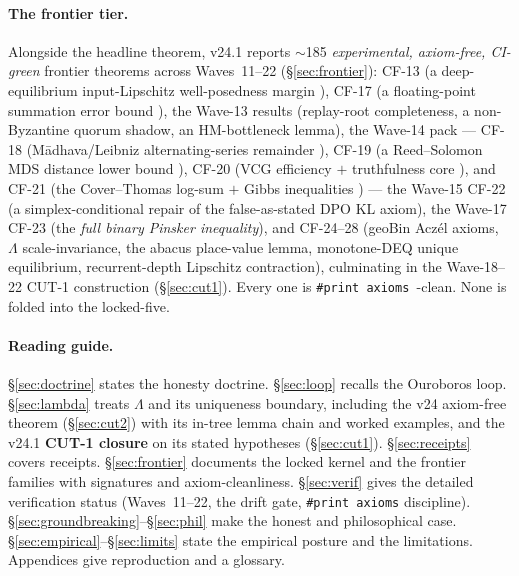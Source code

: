 \documentclass[11pt]{article}
\theoremstyle{plain}
\theoremstyle{definition}
\theoremstyle{remark}
\newcommand{\La}{\Lambda}
\newcommand{\leantext}[1]{\texttt{\def\_{\char`\_\penalty0\hskip0pt\relax}#1}}
\newcommand{\lean}[1]{\ifmmode\text{\leantext{#1}}\else\leantext{#1}\fi}
\newcommand{\printax}[1]{\lean{\#print~axioms~#1}}
\begin{document}
\paragraph{The frontier tier.}
Alongside the headline theorem, v24.1 reports $\sim$185 \emph{experimental,
axiom-free, CI-green} frontier theorems across Waves~11--22
(\S\ref{sec:frontier}): CF-13 (a deep-equilibrium input-Lipschitz well-posedness
margin \cite{baikolter2019}), CF-17 (a floating-point summation error bound
\cite{higham2002}), the Wave-13 results (replay-root completeness, a
non-Byzantine quorum shadow, an HM-bottleneck lemma), the Wave-14 pack ---
CF-18 (M\=adhava/Leibniz alternating-series remainder \cite{plofker2009}),
CF-19 (a Reed--Solomon MDS distance lower bound \cite{reedsolomon1960,singleton1964}),
CF-20 (VCG efficiency $+$ truthfulness core \cite{vickrey1961,clarke1971,groves1973,nisan2007}),
and CF-21 (the Cover--Thomas log-sum $+$ Gibbs inequalities \cite{coverthomas2006})
--- the Wave-15 CF-22 (a simplex-conditional repair of the false-as-stated DPO
KL axiom), the Wave-17 CF-23 (the \emph{full binary Pinsker inequality}), and
CF-24--28 (geoBin Acz\'el axioms, $\La$ scale-invariance, the abacus place-value
lemma, monotone-DEQ unique equilibrium, recurrent-depth Lipschitz contraction),
culminating in the Wave-18--22 CUT-1 construction (\S\ref{sec:cut1}).
Every one is \printax{}-clean. None is folded into the locked-five.

\paragraph{Reading guide.}
\S\ref{sec:doctrine} states the honesty doctrine. \S\ref{sec:loop} recalls the
Ouroboros loop. \S\ref{sec:lambda} treats $\La$ and its uniqueness boundary,
including the v24 axiom-free theorem (\S\ref{sec:cut2}) with its in-tree lemma
chain and worked examples, and the v24.1 \textbf{CUT-1 closure} on its stated
hypotheses (\S\ref{sec:cut1}). \S\ref{sec:receipts} covers receipts.
\S\ref{sec:frontier} documents the locked kernel and the frontier families with
signatures and axiom-cleanliness. \S\ref{sec:verif} gives the detailed
verification status (Waves~11--22, the drift gate, \texttt{\#print axioms}
discipline). \S\ref{sec:groundbreaking}--\S\ref{sec:phil} make the honest and
philosophical case. \S\ref{sec:empirical}--\S\ref{sec:limits} state the empirical
posture and the limitations. Appendices give reproduction and a glossary.

\end{document}
